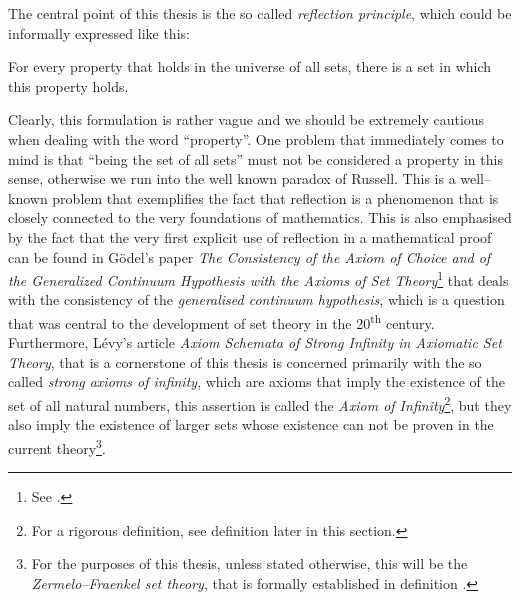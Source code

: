 The central point of this thesis is the so called \emph{reflection principle}, which could be informally expressed like this:
\begin{displayquote}
For every property that holds in the universe of all sets, there is a set in which this property holds.
\end{displayquote}

Clearly, this formulation is rather vague and we should be extremely cautious when dealing with the word ``property''. 
One problem that immediately comes to mind is that ``being the set of all sets'' must not be considered a property in this sense, otherwise we run into the well known paradox of Russell.
This is a well–known problem that exemplifies the fact that reflection is a phenomenon that is closely connected to the very foundations of mathematics.
This is also emphasised by the fact that the very first explicit use of reflection in a mathematical proof can be found in Gödel's paper \emph{The Consistency of the Axiom of Choice and of the Generalized Continuum Hypothesis with the Axioms of Set Theory}\footnote{See \cite{Godel1940consistency}.}
that deals with the consistency of the \emph{generalised continuum hypothesis}, which is a question that was central to the development of set theory in the 20\textsuperscript{th} century.
Furthermore, Lévy's article \emph{Axiom Schemata of Strong Infinity in Axiomatic Set Theory}, that is a cornerstone of this thesis is concerned primarily with the so called \emph{strong axioms of infinity}, which are axioms that imply the existence of the set of all natural numbers, this assertion is called the \emph{Axiom of Infinity}\footnote{For a rigorous definition, see definition  later in this section.}, but they also imply the existence of larger sets whose existence can not be proven in the current theory\footnote{For the purposes of this thesis, unless stated otherwise, this will be the \emph{Zermelo–Fraenkel set theory}, that is formally established in definition .}.

